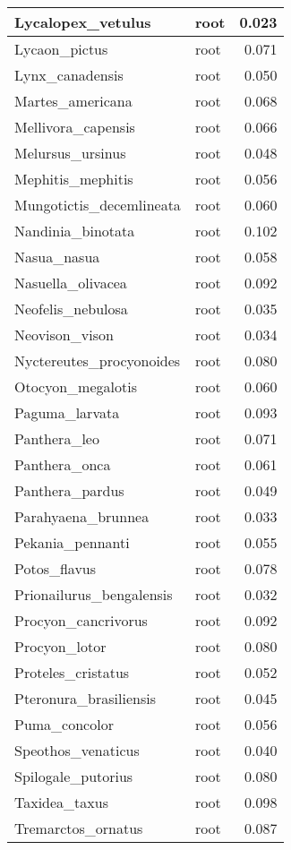 \begin{table}
\begin{tabular}[t]{l|l|r}
\hline
Lycalopex\_vetulus & root & 0.023\\
\hline
Lycaon\_pictus & root & 0.071\\
\hline
Lynx\_canadensis & root & 0.050\\
\hline
Martes\_americana & root & 0.068\\
\hline
Mellivora\_capensis & root & 0.066\\
\hline
Melursus\_ursinus & root & 0.048\\
\hline
Mephitis\_mephitis & root & 0.056\\
\hline
Mungotictis\_decemlineata & root & 0.060\\
\hline
Nandinia\_binotata & root & 0.102\\
\hline
Nasua\_nasua & root & 0.058\\
\hline
Nasuella\_olivacea & root & 0.092\\
\hline
Neofelis\_nebulosa & root & 0.035\\
\hline
Neovison\_vison & root & 0.034\\
\hline
Nyctereutes\_procyonoides & root & 0.080\\
\hline
Otocyon\_megalotis & root & 0.060\\
\hline
Paguma\_larvata & root & 0.093\\
\hline
Panthera\_leo & root & 0.071\\
\hline
Panthera\_onca & root & 0.061\\
\hline
Panthera\_pardus & root & 0.049\\
\hline
Parahyaena\_brunnea & root & 0.033\\
\hline
Pekania\_pennanti & root & 0.055\\
\hline
Potos\_flavus & root & 0.078\\
\hline
Prionailurus\_bengalensis & root & 0.032\\
\hline
Procyon\_cancrivorus & root & 0.092\\
\hline
Procyon\_lotor & root & 0.080\\
\hline
Proteles\_cristatus & root & 0.052\\
\hline
Pteronura\_brasiliensis & root & 0.045\\
\hline
Puma\_concolor & root & 0.056\\
\hline
Speothos\_venaticus & root & 0.040\\
\hline
Spilogale\_putorius & root & 0.080\\
\hline
Taxidea\_taxus & root & 0.098\\
\hline
Tremarctos\_ornatus & root & 0.087\\

\end{tabular}
\end{table}
